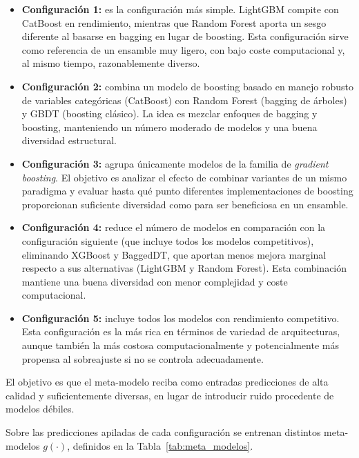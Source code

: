 \begin{itemize}
    \item \textbf{Configuración 1:} es la configuración más simple. LightGBM compite con CatBoost en rendimiento, mientras que Random Forest aporta un sesgo diferente al basarse en bagging en lugar de boosting. Esta configuración sirve como referencia de un ensamble muy ligero, con bajo coste computacional y, al mismo tiempo, razonablemente diverso.
    
    \item \textbf{Configuración 2:} combina un modelo de boosting basado en manejo robusto de variables categóricas (CatBoost) con Random Forest (bagging de árboles) y GBDT (boosting clásico). La idea es mezclar enfoques de bagging y boosting, manteniendo un número moderado de modelos y una buena diversidad estructural.
    
    \item \textbf{Configuración 3:} agrupa únicamente modelos de la familia de \textit{gradient boosting}. El objetivo es analizar el efecto de combinar variantes de un mismo paradigma y evaluar hasta qué punto diferentes implementaciones de boosting proporcionan suficiente diversidad como para ser beneficiosa en un ensamble.
    
    \item \textbf{Configuración 4:} reduce el número de modelos en comparación con la configuración siguiente (que incluye todos los modelos competitivos), eliminando XGBoost y BaggedDT, que aportan menos mejora marginal respecto a sus alternativas (LightGBM y Random Forest). Esta combinación mantiene una buena diversidad con menor complejidad y coste computacional.
    
    \item \textbf{Configuración 5:} incluye todos los modelos con rendimiento competitivo. Esta configuración es la más rica en términos de variedad de arquitecturas, aunque también la más costosa computacionalmente y potencialmente más propensa al sobreajuste si no se controla adecuadamente.
\end{itemize}

El objetivo es que el meta-modelo reciba como entradas predicciones de alta calidad y suficientemente diversas, en lugar de introducir ruido procedente de modelos débiles.

Sobre las predicciones apiladas de cada configuración se entrenan distintos meta-modelos $g(\cdot)$, definidos en la Tabla~\ref{tab:meta_modelos}.

